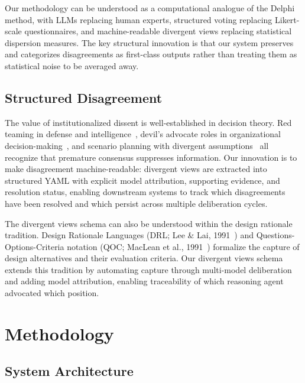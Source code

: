 \documentclass[11pt,a4paper]{article}
\begin{document}
Our methodology can be understood as a computational analogue of the Delphi method, with LLMs replacing human experts, structured voting replacing Likert-scale questionnaires, and machine-readable divergent views replacing statistical dispersion measures. The key structural innovation is that our system preserves and categorizes disagreements as first-class outputs rather than treating them as statistical noise to be averaged away.

\subsection{Structured Disagreement}

The value of institutionalized dissent is well-established in decision theory. Red teaming in defense and intelligence~\cite{zenko2015red}, devil's advocate roles in organizational decision-making~\cite{schwenk1990effects}, and scenario planning with divergent assumptions~\cite{schwartz1996art} all recognize that premature consensus suppresses information. Our innovation is to make disagreement machine-readable: divergent views are extracted into structured YAML with explicit model attribution, supporting evidence, and resolution status, enabling downstream systems to track which disagreements have been resolved and which persist across multiple deliberation cycles.

The divergent views schema can also be understood within the design rationale tradition. Design Rationale Languages (DRL; Lee \& Lai, 1991~\cite{lee1991drl}) and Questions-Options-Criteria notation (QOC; MacLean et al., 1991~\cite{maclean1991qoc}) formalize the capture of design alternatives and their evaluation criteria. Our divergent views schema extends this tradition by automating capture through multi-model deliberation and adding model attribution, enabling traceability of which reasoning agent advocated which position.

\section{Methodology}
\label{sec:methodology}

\subsection{System Architecture}
\label{sec:architecture}
\end{document}
